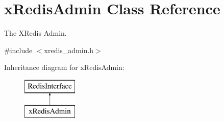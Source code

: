\hypertarget{classxRedisAdmin}{\section{x\-Redis\-Admin Class Reference}
\label{classxRedisAdmin}
}


The X\-Redis Admin.  




{\ttfamily \#include $<$xredis\-\_\-admin.\-h$>$}

Inheritance diagram for x\-Redis\-Admin\-:\begin{figure}[H]
\begin{center}
\leavevmode
\includegraphics[height=2.000000cm]{classxRedisAdmin}
\end{center}
\end{figure}
